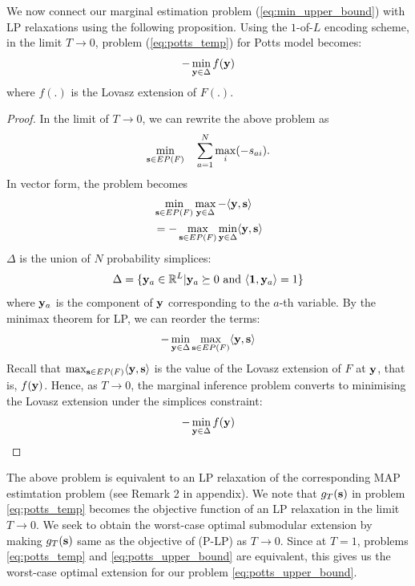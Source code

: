 We now connect our marginal estimation problem (\ref{eq:min_upper_bound}) with
LP relaxations using the following proposition.
{\proposition Using the $1$-of-$L$ encoding scheme, in the limit $T \to 0$,
  problem (\ref{eq:potts_temp}) for Potts model becomes:
\begin{align}
    - \min_{{\bf y} \in \Delta} f({\bf y}) 
\end{align}
where $f(.)$ is the Lovasz extension of $F(.)$.
\label{proposition:potts_equiv}}

\begin{proof}
In the limit of $T \to 0$, we can rewrite the above problem as
\begin{equation}
    \min_{{\bf s} \in EP(F)} \quad \sum_{a = 1}^{N} \max_{i} (-s_{ai}).
\end{equation}
In vector form, the problem becomes
\begin{align}
    &\min_{{\bf s} \in EP(F)} \max_{{\bf y} \in \Delta} - \langle {\bf y}, {\bf s} \rangle \\
    & = - \max_{{\bf s} \in EP(F)} \min_{{\bf y} \in \Delta} \langle {\bf y}, {\bf s} \rangle
    \label{eq:maxmin}
\end{align}
$\Delta$ is the union of $N$ probability simplices:
\begin{equation}
    \Delta = \{{\bf y}_a \in \mathbb{R}^L | {\bf y}_a \succeq 0  \textrm{ and } \langle {\bf 1}, {\bf y}_a \rangle = 1\}
    \label{eq:delta2}
\end{equation}
where ${\bf y}_a$ is the component of $\bf y$ corresponding to the $a$-th variable. By the minimax theorem for LP, we can reorder the terms:
\begin{equation}
    - \min_{{\bf y} \in \Delta} \max_{{\bf s} \in EP(F)} \langle {\bf y}, {\bf s} \rangle 
    \label{eq:minmax}
\end{equation}
Recall that $\max_{{\bf s} \in EP(F)} \langle {\bf y}, {\bf s} \rangle$ is the value of the Lovasz extension of $F$ at $\bf y$, that is, $f({\bf y})$. Hence, as $T \to 0$, the marginal inference problem converts to minimising the Lovasz extension under the simplices constraint:
\begin{equation}
    - \min_{{\bf y} \in \Delta} f({\bf y}) 
    \label{eq:minLovasz}
\end{equation}
\end{proof}

The above problem is equivalent to an LP relaxation of the corresponding MAP estimtation problem (see Remark 2 in appendix). We note that $g_T ({\bf s})$ in problem \eqref{eq:potts_temp} becomes the objective function of an LP relaxation in the limit $T \to 0$. We seek to obtain the worst-case optimal submodular extension by making $g_T ({\bf s})$ same as the objective of (P-LP) as $T \to 0$. Since at $T = 1$, problems \eqref{eq:potts_temp} and \eqref{eq:potts_upper_bound} are equivalent, this gives us the worst-case optimal extension for our problem \eqref{eq:potts_upper_bound}. 

